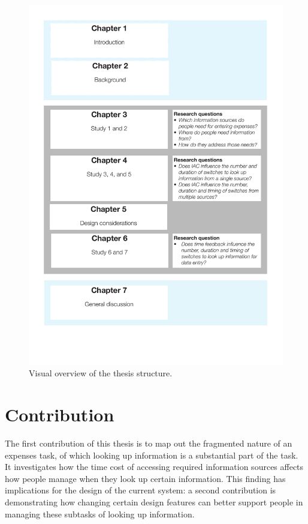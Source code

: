 \begin{figure}
\centering
\includegraphics[width=1\textwidth]{images/ThesisOverview.pdf}
\caption{Visual overview of the thesis structure.}
\label{fig:ch1-thesisoverview}
\end{figure}

\section{Contribution}
The first contribution of this thesis is to map out the fragmented nature of an expenses task, of which looking up information is a substantial part of the task. It investigates how the time cost of accessing required information sources affects how people manage when they look up certain information. This finding has implications for the design of the current system: a second contribution is demonstrating how changing certain design features can better support people in managing these subtasks of looking up information.
